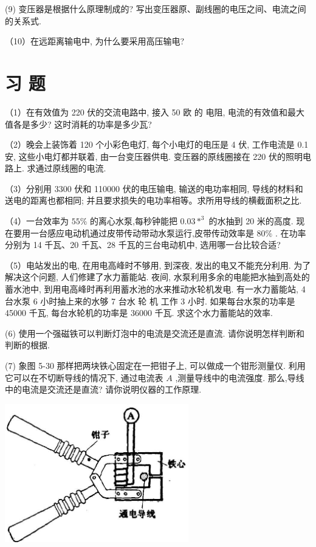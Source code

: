 \documentclass[10pt]{article}
\begin{document}
(9) 变压器是根据什么原理制成的? 写出变压器原、副线圈的电压之间、电流之间的关系式.

（10）在远距离输电中, 为什么要采用高压输电?

\section*{习 题}

（1）在有效值为 220 伏的交流电路中, 接入 50 欧 的 电阻, 电流的有效值和最大值各是多少? 这时消耗的功率是多少瓦?

（2）晚会上装饰着 120 个小彩色电灯, 每个小电灯的电压是 4 伏, 工作电流是 0.1 安, 这些小电灯都并联着, 由一台变压器供电. 变压器的原线圈接在 220 伏的照明电路上. 求通过原线圈的电流.

（3）分别用 3300 伏和 110000 伏的电压输电, 输送的电功率相同, 导线的材料和送电的距离也都相同; 并且要求损失的电功率相等。求所用导线的横截面积之比.

（4）一台效率为 \({55}\%\) 的离心水泵,每秒钟能把 \({0.03}{ * }^{3}\) 的水抽到 20 米的高度. 现在要用一台感应电动机通过皮带传动带动水泵运行,皮带传动效率是 \({80}\%\) . 在功率分别为 14 千瓦、20 千瓦、28 千瓦的三台电动机中, 选用哪一台比较合适?

（5）电站发出的电, 在用电高峰时不够用, 到深夜, 发出的电又不能充分利用. 为了解决这个问题, 人们修建了水力蓄能站. 夜间, 水泵利用多余的电能把水抽到高处的蓄水池中, 到用电高峰时再利用蓄水池的水来推动水轮机发电. 有一水力蓄能站, 4 台水泵 6 小时抽上来的水够 7 台水 轮 机 工作 3 小时. 如果每台水泵的功率是 45000 千瓦, 每台水轮机的功率是 36000 千瓦. 求这个水力蓄能站的效率.

(6) 使用一个强磁铁可以判断灯泡中的电流是交流还是直流. 请你说明怎样判断和判断的根据.

(7) 象图 5-30 那样把两块铁心固定在一把钳子上, 可以做成一个钳形测量仪. 利用它可以在不切断导线的情况下, 通过电流表 \(A\) ,测量导线中的电流强度. 那么,导线中的电流是交流还是直流? 请你说明仪器的工作原理.

\begin{center}
\includegraphics[max width=0.6\textwidth]{images/01913056-1f15-74d8-9184-9aab52c9d66b_192_568992.jpg}
\end{center}
\end{document}
